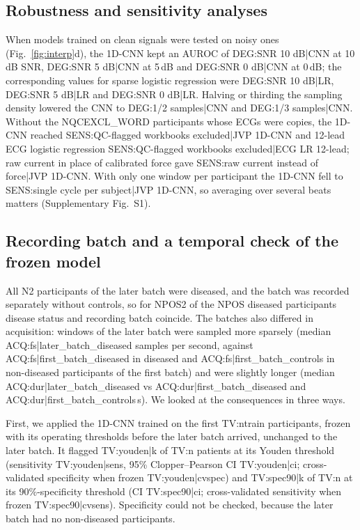 \documentclass[11pt]{article}
\begin{document}
\subsection*{Robustness and sensitivity analyses}
When models trained on clean signals were tested on noisy ones (Fig.~\ref{fig:interp}d), the 1D-CNN kept an AUROC of {{DEG:SNR 10 dB|CNN}} at 10\,dB SNR, {{DEG:SNR 5 dB|CNN}} at 5\,dB and {{DEG:SNR 0 dB|CNN}} at 0\,dB; the corresponding values for sparse logistic regression were {{DEG:SNR 10 dB|LR}}, {{DEG:SNR 5 dB|LR}} and {{DEG:SNR 0 dB|LR}}. Halving or thirding the sampling density lowered the CNN to {{DEG:1/2 samples|CNN}} and {{DEG:1/3 samples|CNN}}. Without the {{NQCEXCL_WORD}} participants whose ECGs were copies, the 1D-CNN reached {{SENS:QC-flagged workbooks excluded|JVP 1D-CNN}} and 12-lead ECG logistic regression {{SENS:QC-flagged workbooks excluded|ECG LR 12-lead}}; raw current in place of calibrated force gave {{SENS:raw current instead of force|JVP 1D-CNN}}. With only one window per participant the 1D-CNN fell to {{SENS:single cycle per subject|JVP 1D-CNN}}, so averaging over several beats matters (Supplementary Fig.~S1).

\subsection*{Recording batch and a temporal check of the frozen model}
All {{N2}} participants of the later batch were diseased, and the batch was recorded separately without controls, so for {{NPOS2}} of the {{NPOS}} diseased participants disease status and recording batch coincide. The batches also differed in acquisition: windows of the later batch were sampled more sparsely (median {{ACQ:fs|later_batch_diseased}} samples per second, against {{ACQ:fs|first_batch_diseased}} in diseased and {{ACQ:fs|first_batch_controls}} in non-diseased participants of the first batch) and were slightly longer (median {{ACQ:dur|later_batch_diseased}} vs {{ACQ:dur|first_batch_diseased}} and {{ACQ:dur|first_batch_controls}}\,s). We looked at the consequences in three ways.

First, we applied the 1D-CNN trained on the first {{TV:ntrain}} participants, frozen with its operating thresholds before the later batch arrived, unchanged to the later batch. It flagged {{TV:youden|k}} of {{TV:n}} patients at its Youden threshold (sensitivity {{TV:youden|sens}}, 95\% Clopper--Pearson CI {{TV:youden|ci}}; cross-validated specificity when frozen {{TV:youden|cvspec}}) and {{TV:spec90|k}} of {{TV:n}} at its 90\%-specificity threshold (CI {{TV:spec90|ci}}; cross-validated sensitivity when frozen {{TV:spec90|cvsens}}). Specificity could not be checked, because the later batch had no non-diseased participants.
\end{document}
